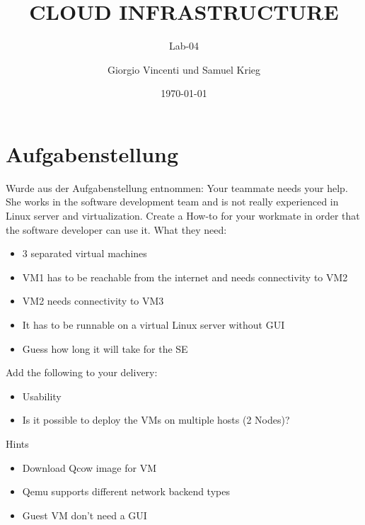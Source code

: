 \documentclass[a4,12pt]{scrartcl}
\title{CLOUD INFRASTRUCTURE}
\subtitle{Lab-04}
\author{Giorgio Vincenti und Samuel Krieg}
\date{\today}
\begin{document}
\clearpage\maketitle
\thispagestyle{empty}
\tableofcontents
\newpage

\section{Aufgabenstellung}
Wurde aus der Aufgabenstellung entnommen: \newline
\newline
Your teammate needs your help. She works in the software development team and is not really experienced in Linux server and virtualization. Create a How-to for your workmate in order that the software developer can use it.
\newline
\newline
What they need:
\begin{itemize}
\item 3 separated virtual machines
\item  VM1 has to be reachable from the internet and needs connectivity to VM2
\item VM2 needs connectivity to VM3
\item It has to be runnable on a virtual Linux server without GUI
\item Guess how long it will take for the SE
\end{itemize}

Add the following to your delivery:
\begin{itemize}
\item Usability
\item Is it possible to deploy the VMs on multiple hosts (2 Nodes)?
\end{itemize}

Hints
\begin{itemize}
\item Download Qcow image for VM
\item Qemu supports different network backend types
\item Guest VM don’t need a GUI
\end{itemize}
\end{document}
